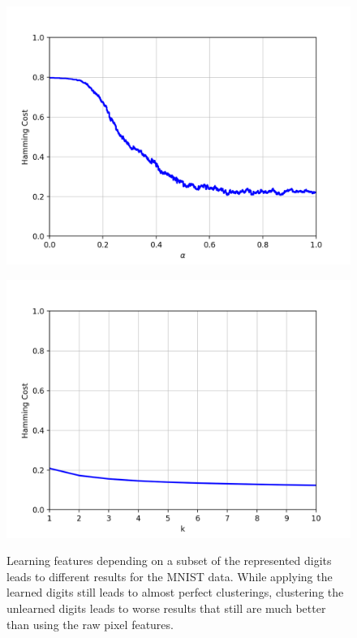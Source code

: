 \begin{figure}[h]
\begin{minipage}{.31\textwidth}
\end{minipage}\quad
\begin{minipage}{.31\textwidth}
  \centering
  {\includegraphics[width=\linewidth]{plots/mnist-cnn-sub-sc}}
\end{minipage}\quad
\begin{minipage}{.31\textwidth}
  \centering
  {\includegraphics[width=\linewidth]{plots/mnist-cnn-sub-sc-top10}}
\end{minipage}
\caption{Learning features depending on a subset of the represented digits leads to different results for the MNIST data. While applying the learned digits still leads to almost perfect clusterings, clustering the unlearned digits leads to worse results that still are much better than using the raw pixel features.}
\label{fig:mnist1000cnnsub}
\end{figure}